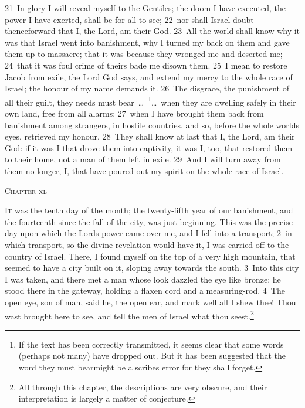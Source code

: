 \documentclass[10pt]{book} %
\begin{document}
\textcolor{benred8}{21}~In glory I will reveal myself to the Gentiles; the doom I have executed, the power I have exerted, shall be for all to see; \textcolor{benred8}{22}~nor shall Israel doubt thenceforward that I, the Lord, am their God. \textcolor{benred8}{23}~All the world shall know why it was that Israel went into banishment, why I turned my back on them and gave them up to massacre; that it was because they wronged me and deserted me; \textcolor{benred8}{24}~that it was foul crime of theirs bade me disown them. \textcolor{benred8}{25}~I mean to restore Jacob from exile, the Lord God says, and extend my mercy to the whole race of Israel; the honour of my name demands it. \textcolor{benred8}{26}~The disgrace, the punishment of all their guilt, they needs must bear~\ldots\ \footnote[1]{If the text has been correctly transmitted, it seems clear that some words (perhaps not many) have dropped out. But it has been suggested that the word \textasciigrave they must bear\textquotesingle  might be a scribe\textquotesingle s error for \textasciigrave they shall forget\textquotesingle .}\ldots\  when they are dwelling safely in their own land, free from all alarms; \textcolor{benred8}{27}~when I have brought them back from banishment among strangers, in hostile countries, and so, before the whole world\textquotesingle s eyes, retrieved my honour. \textcolor{benred8}{28}~They shall know at last that I, the Lord, am their God: if it was I that drove them into captivity, it was I, too, that restored them to their home, not a man of them left in exile. \textcolor{benred8}{29}~And I will turn away from them no longer, I, that have poured out my spirit on the whole race of Israel.
\begin{large}\begin{center}\textsc{Chapter xl}\end{center}\end{large}
\lettrine[lines=2]{I}{t} was the tenth day of the month; the twenty-fifth year of our banishment, and the fourteenth since the fall of the city, was just beginning. This was the precise day upon which the Lord\textquotesingle s power came over me, and I fell into a transport; \textcolor{benred8}{2}~in which transport, so the divine revelation would have it, I was carried off to the country of Israel. There, I found myself on the top of a very high mountain, that seemed to have a city built on it, sloping away towards the south. \textcolor{benred8}{3}~Into this city I was taken, and there met a man whose look dazzled the eye like bronze; he stood there in the gateway, holding a flaxen cord and a measuring-rod. \textcolor{benred8}{4}~The open eye, son of man, said he, the open ear, and mark well all I shew thee! Thou wast brought here to see, and tell the men of Israel what thou seest.\footnote[1]{All through this chapter, the descriptions are very obscure, and their interpretation is largely a matter of conjecture.}
\end{document}
